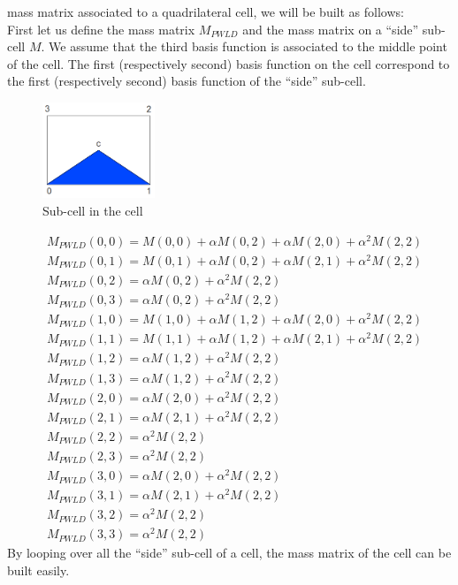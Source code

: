 mass matrix associated to a quadrilateral cell, we will be built as follows:\\
First let us define the 
mass matrix $M_{PWLD}$ and the mass matrix on a ``side'' sub-cell $M$. We assume 
that the third basis function is associated to the middle point of the cell. 
The first (respectively second) basis function on the cell correspond to the 
first (respectively second) basis function of the ``side'' sub-cell.
\begin{figure}[H]
  \centering
  \includegraphics[width=0.3\textwidth]{mass_matrix}
  \caption{Sub-cell in the cell}
\end{figure}
{\allowdisplaybreaks
\begin{align}
& M_{PWLD}(0,0) =  M(0,0) + \alpha M(0,2) + \alpha M(2,0) + 
\alpha^2M(2,2)\\
& M_{PWLD}(0,1) =  M(0,1) + \alpha M(0,2) + \alpha M(2,1) + 
\alpha^2M(2,2)\\
& M_{PWLD}(0,2) =  \alpha M(0,2) + \alpha^2 M(2,2)\\
& M_{PWLD}(0,3) =  \alpha M(0,2) + \alpha^2M(2,2)\\
& M_{PWLD}(1,0) =  M(1,0) + \alpha M(1,2) + \alpha M(2,0) + 
\alpha^2M(2,2)\\
& M_{PWLD}(1,1) =  M(1,1) + \alpha M(1,2) + \alpha M(2,1) + 
\alpha^2M(2,2)\\
& M_{PWLD}(1,2) =  \alpha M(1,2) + \alpha^2M(2,2)\\
& M_{PWLD}(1,3) =  \alpha M(1,2) + \alpha^2M(2,2)\\
& M_{PWLD}(2,0) =  \alpha M(2,0) + \alpha^2M(2,2)\\
& M_{PWLD}(2,1) =  \alpha M(2,1) + \alpha^2M(2,2)\\
& M_{PWLD}(2,2) =  \alpha^2M(2,2)\\
& M_{PWLD}(2,3) =  \alpha^2M(2,2)\\
& M_{PWLD}(3,0) =  \alpha M(2,0) + \alpha^2M(2,2)\\
& M_{PWLD}(3,1) =  \alpha M(2,1) + \alpha^2M(2,2)\\
& M_{PWLD}(3,2) =  \alpha^2M(2,2)\\
& M_{PWLD}(3,3) =  \alpha^2M(2,2)
\end{align}}    
By looping over all the ``side'' sub-cell of a cell, the mass matrix of the 
cell can be built easily.
